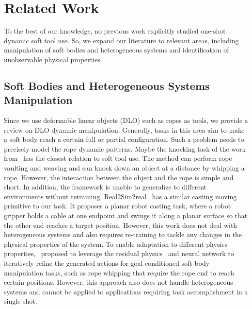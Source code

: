 \section{Related Work}
\label{sec:related}
To the best of our knowledge, no previous work explicitly studied one-shot dynamic soft tool use. So, we expand our literature to relevant areas, including manipulation of soft bodies and heterogeneous systems and identification of unobservable physical properties.
\subsection{Soft Bodies and Heterogeneous Systems Manipulation}
Since we use deformable linear objects (DLO) such as ropes as tools, we provide a review on DLO dynamic manipulation. Generally, tasks in this area aim to make a soft body reach a certain full or partial configuration. Such a problem needs to precisely model the rope dynamic patterns. Maybe the knocking task of the work from~\cite{zhang2021robots} has the closest relation to soft tool use. The method can perform rope vaulting and weaving and can knock down an object at a distance by whipping a rope. However, the interaction between the object and the rope is simple and short. In addition, the framework is unable to generalize to different environments without retraining. {Real2Sim2real}~\cite{9811651} has a similar casting moving primitive to our task. It proposes a planar robot casting task, where a robot gripper holds a cable at one endpoint and swings it along a planar surface so that the other end reaches a target position. However, this work does not deal with heterogeneous systems and also requires re-training to tackle any changes in the physical properties of the system. To enable adaptation to different physics properties,~\cite{chi2022irp} proposed to leverage the residual physics~\cite{zeng2020tossingbot} and neural network to iteratively refine the generated actions for goal-conditioned soft body manipulation tasks, such as rope whipping that require the rope end to reach certain positions. However, this approach also does not handle heterogeneous systems and cannot be applied to applications requiring task accomplishment in a single shot.  

